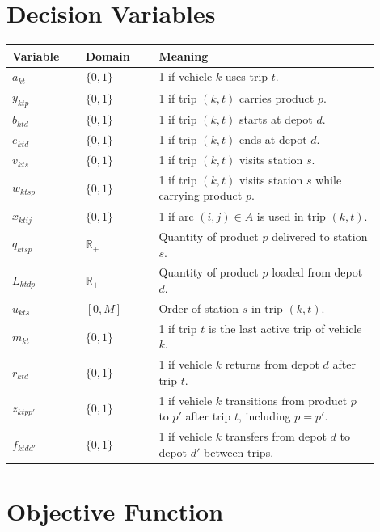 \documentclass[11pt,a4paper]{article}
\begin{document}
\section{Decision Variables}

\begin{table}[h]
\centering
\begin{tabular}{p{0.18\linewidth}p{0.18\linewidth}p{0.54\linewidth}}
\toprule
Variable & Domain & Meaning \\
\midrule
\(a_{kt}\) & \(\{0,1\}\) & 1 if vehicle \(k\) uses trip \(t\). \\
\(y_{ktp}\) & \(\{0,1\}\) & 1 if trip \((k,t)\) carries product \(p\). \\
\(b_{ktd}\) & \(\{0,1\}\) & 1 if trip \((k,t)\) starts at depot \(d\). \\
\(e_{ktd}\) & \(\{0,1\}\) & 1 if trip \((k,t)\) ends at depot \(d\). \\
\(v_{kts}\) & \(\{0,1\}\) & 1 if trip \((k,t)\) visits station \(s\). \\
\(w_{ktsp}\) & \(\{0,1\}\) & 1 if trip \((k,t)\) visits station \(s\) while carrying product \(p\). \\
\(x_{ktij}\) & \(\{0,1\}\) & 1 if arc \((i,j)\in A\) is used in trip \((k,t)\). \\
\(q_{ktsp}\) & \(\mathbb{R}_+\) & Quantity of product \(p\) delivered to station \(s\). \\
\(L_{ktdp}\) & \(\mathbb{R}_+\) & Quantity of product \(p\) loaded from depot \(d\). \\
\(u_{kts}\) & \([0,M]\) & Order of station \(s\) in trip \((k,t)\). \\
\(m_{kt}\) & \(\{0,1\}\) & 1 if trip \(t\) is the last active trip of vehicle \(k\). \\
\(r_{ktd}\) & \(\{0,1\}\) & 1 if vehicle \(k\) returns from depot \(d\) after trip \(t\). \\
\(z_{ktpp'}\) & \(\{0,1\}\) & 1 if vehicle \(k\) transitions from product \(p\) to \(p'\) after trip \(t\), including \(p=p'\). \\
\(f_{ktdd'}\) & \(\{0,1\}\) & 1 if vehicle \(k\) transfers from depot \(d\) to depot \(d'\) between trips. \\
\bottomrule
\end{tabular}
\end{table}

\section{Objective Function}
\end{document}
